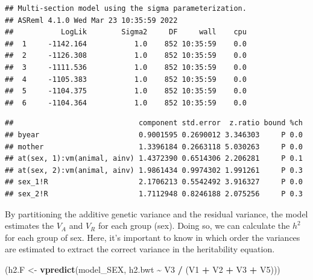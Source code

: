 \documentclass[
  12pt,
]{book}
\newenvironment{Shaded}{\begin{snugshade}}{\end{snugshade}}
\newcommand{\KeywordTok}[1]{\textcolor[rgb]{0.13,0.29,0.53}{\textbf{#1}}}
\newcommand{\NormalTok}[1]{#1}
\newcommand{\OperatorTok}[1]{\textcolor[rgb]{0.81,0.36,0.00}{\textbf{#1}}}
\newcommand{\StringTok}[1]{\textcolor[rgb]{0.31,0.60,0.02}{#1}}
\begin{document}
\begin{verbatim}
## Multi-section model using the sigma parameterization.
## ASReml 4.1.0 Wed Mar 23 10:35:59 2022
##           LogLik        Sigma2     DF     wall    cpu
##  1     -1142.164           1.0    852 10:35:59    0.0
##  2     -1126.308           1.0    852 10:35:59    0.0
##  3     -1111.536           1.0    852 10:35:59    0.0
##  4     -1105.383           1.0    852 10:35:59    0.0
##  5     -1104.375           1.0    852 10:35:59    0.0
##  6     -1104.364           1.0    852 10:35:59    0.0
\end{verbatim}

\begin{Shaded}
\end{Shaded}

\begin{verbatim}
##                             component std.error  z.ratio bound %ch
## byear                       0.9001595 0.2690012 3.346303     P 0.0
## mother                      1.3396184 0.2663118 5.030263     P 0.0
## at(sex, 1):vm(animal, ainv) 1.4372390 0.6514306 2.206281     P 0.1
## at(sex, 2):vm(animal, ainv) 1.9861434 0.9974302 1.991261     P 0.3
## sex_1!R                     2.1706213 0.5542492 3.916327     P 0.0
## sex_2!R                     1.7112948 0.8246188 2.075256     P 0.3
\end{verbatim}

By partitioning the additive genetic variance and the residual variance, the model estimates the \(V_A\) and \(V_R\) for each group (sex). Doing so, we can calculate the \(h^2\) for each group of sex. Here, it's important to know in which order the variances are estimated to extract the correct variance in the heritability equation.

\begin{Shaded}
\begin{Highlighting}[]
\NormalTok{(h2.F \textless{}{-}}\StringTok{ }\KeywordTok{vpredict}\NormalTok{(model\_SEX, h2.bwt }\OperatorTok{\textasciitilde{}}\StringTok{ }\NormalTok{V3 }\OperatorTok{/}\StringTok{ }\NormalTok{(V1 }\OperatorTok{+}\StringTok{ }\NormalTok{V2 }\OperatorTok{+}\StringTok{ }\NormalTok{V3 }\OperatorTok{+}\StringTok{ }\NormalTok{V5)))}
\end{Highlighting}
\end{Shaded}
\end{document}
